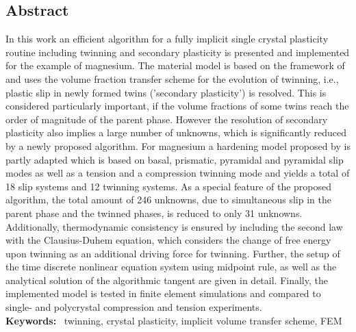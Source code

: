 \subsection*{Abstract}
In this work an efficient algorithm for a fully implicit single crystal plasticity routine including twinning and secondary plasticity is presented and implemented for the example of magnesium. The material model is based on the framework of  and uses the volume fraction transfer scheme for the evolution of twinning, i.e., plastic slip in newly formed twins ('secondary plasticity') is resolved. This is considered particularly important, if the volume fractions of some twins reach the order of magnitude of the parent phase. However the resolution of secondary plasticity also implies a large number of unknowns, which is significantly reduced by a newly proposed algorithm. For magnesium a hardening model proposed by  is partly adapted which is based on basal, prismatic, pyramidal \pyra and pyramidal \pyrac slip modes as well as a tension and a compression twinning mode and yields a total of 18 slip systems and 12 twinning systems. As a special feature of the proposed algorithm, the total amount of 246 unknowns, due to simultaneous slip in the parent phase and the twinned phases, is reduced to only 31 unknowns. Additionally, thermodynamic consistency is ensured by including the second law with the Clausius-Duhem equation, which considers the change of free energy upon twinning as an additional driving force for twinning. Further, the setup of the time discrete nonlinear equation system using midpoint rule, as well as the analytical solution of the algorithmic tangent are given in detail. Finally, the implemented model is tested in finite element simulations and compared to single- and polycrystal compression and tension experiments. \\

\textbf{Keywords: }~twinning, crystal plasticity, implicit volume transfer scheme, FEM

